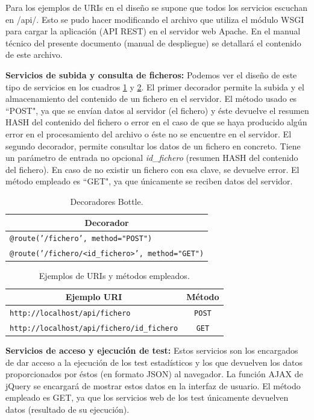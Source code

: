 Para los ejemplos de URIs en el diseño se supone que todos los servicios escuchan en /api/. Esto se pudo hacer modificando el archivo que utiliza el módulo WSGI para cargar la aplicación (API REST) en el servidor web Apache. En el manual técnico del presente documento (manual de despliegue) se detallará el contenido de este archivo.

\textbf{Servicios de subida y consulta de ficheros:} Podemos ver el diseño de este tipo de servicios en los cuadros \ref{cuadro1} y \ref{cuadro2}. El primer decorador permite la subida y el almacenamiento del contenido de un fichero en el servidor. El método usado es ``POST", ya que se envían datos al servidor (el fichero) y éste devuelve el resumen HASH del contenido del fichero o error en el caso de que se haya producido algún error en el procesamiento del archivo o éste no se encuentre en el servidor. El segundo decorador, permite consultar los datos de un fichero en concreto. Tiene un parámetro de entrada no opcional \textit{id\_fichero} (resumen HASH del contenido del fichero). En caso de no existir un fichero con esa clave, se devuelve error. El método empleado es ``GET", ya que únicamente se reciben datos del servidor.

\begin{table}[H]
	\centering
	\begin{tabular}{|l|}
		\hline
		\multicolumn{1}{|c|}{\textbf{Decorador}} \\ \hline
		\texttt{@route('/fichero', method="POST")} \\ \hline
		\texttt{@route('/fichero/<id\_fichero>', method="GET")} \\ \hline
	\end{tabular}
	\caption{Decoradores Bottle.}
	\label{cuadro1}
\end{table}

\begin{table}[H]
	\centering
	\begin{tabular}{|l|c|}
		\hline
		\multicolumn{1}{|c|}{\textbf{Ejemplo URI}} & {\textbf{Método}} \\ \hline
		\texttt{http://localhost/api/fichero} & \texttt{POST} \\ \hline
		\texttt{http://localhost/api/fichero/id\_fichero} & \texttt{GET} \\ \hline
	\end{tabular}
	\caption{Ejemplos de URIs y métodos empleados.}
	\label{cuadro2}
\end{table}

\textbf{Servicios de acceso y ejecución de test:} Estos servicios son los encargados de dar acceso a la ejecución de los test estadísticos y los que devuelven los datos proporcionados por éstos (en formato JSON) al navegador. La función AJAX de jQuery se encargará de mostrar estos datos en la interfaz de usuario. El método empleado es GET, ya que los servicios web de los test únicamente devuelven datos (resultado de su ejecución).

